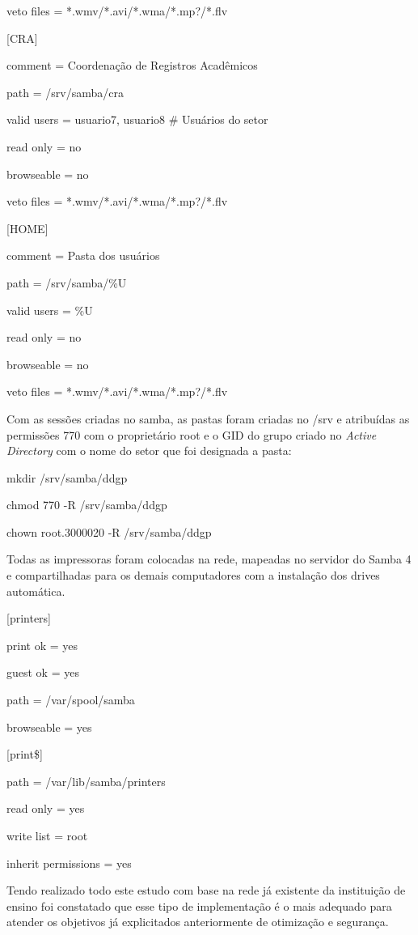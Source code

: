 veto files = *.wmv/*.avi/*.wma/*.mp?/*.flv

[CRA] 

comment = Coordenação de Registros Acadêmicos

path = /srv/samba/cra

valid users = usuario7, usuario8 \# Usuários do setor

read only = no

browseable = no

veto files = *.wmv/*.avi/*.wma/*.mp?/*.flv


[HOME] 

comment = Pasta dos usuários

path = /srv/samba/\%U

valid users = \%U

read only = no

browseable = no

veto files = *.wmv/*.avi/*.wma/*.mp?/*.flv

Com as sessões criadas no samba, as pastas foram criadas no /srv e atribuídas as permissões 770 com o proprietário root e o GID do grupo criado no \textit{Active Directory} com o nome do setor que foi designada a pasta:

mkdir /srv/samba/ddgp

chmod 770 -R /srv/samba/ddgp

chown root.3000020 -R /srv/samba/ddgp

Todas as impressoras foram colocadas na rede, mapeadas no servidor do Samba 4 e compartilhadas para os demais computadores com a instalação dos drives automática.

[printers] 

print ok = yes 

guest ok = yes

path = /var/spool/samba 

browseable = yes

[print\$] 

path = /var/lib/samba/printers 

read only = yes

write list = root 

inherit permissions = yes

Tendo realizado todo este estudo com base na rede já existente da instituição de ensino foi constatado que esse tipo de implementação é o mais adequado para atender os objetivos já explicitados anteriormente de otimização e segurança.